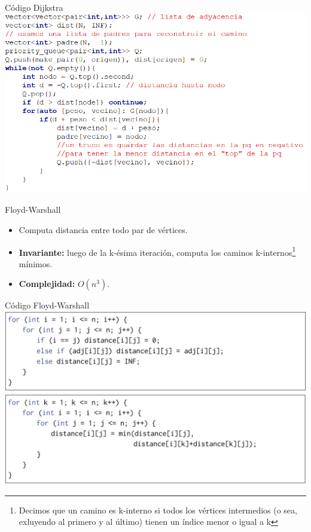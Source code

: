 \documentclass{beamer}
\begin{document}
\begin{frame}{Código Dijkstra}
	\centering
	\includegraphics[scale=0.47]{figuras/codigo-dijkstra.PNG}
\end{frame}

\begin{frame}{Floyd-Warshall}
	\begin{itemize}
		\item Computa distancia entre todo par de vértices.
		\item \textbf{Invariante:} luego de la k-ésima iteración, computa los caminos k-internos\footnote{Decimos que un camino es k-interno si todos los vértices intermedios (o sea, exluyendo al primero y al último) tienen un índice menor o igual a k} mínimos.
		\item \textbf{Complejidad:} $O(n^3)$.
	\end{itemize}
\end{frame}

\begin{frame}{Código Floyd-Warshall}
	\centering
	\includegraphics[scale=0.35]{figuras/codigo-floyd-1.PNG}
	\includegraphics[scale=0.35]{figuras/codigo-floyd-2.PNG}
\end{frame}
\end{document}
